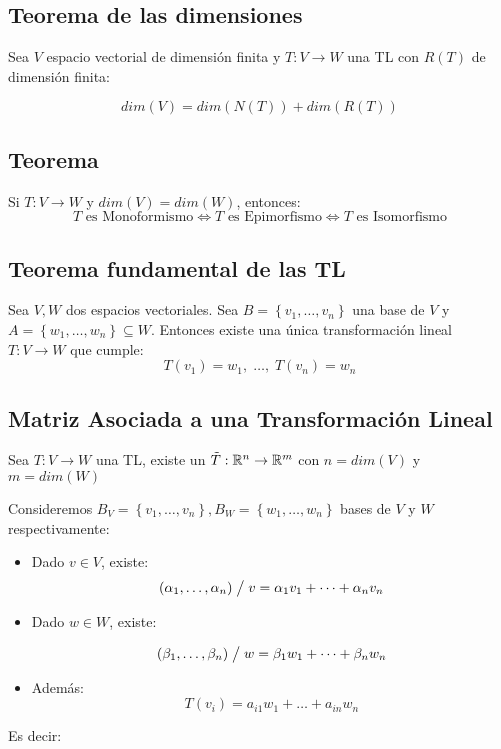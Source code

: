 \subsection{Teorema de las dimensiones}
Sea $ V $ espacio vectorial de dimensión finita y $ T : V \to W $ una TL con $ R(T) $ de dimensión finita:

\[
    dim(V) = dim(N(T)) + dim(R(T))
\]

\subsection{Teorema}
Si $ T: V \to W $ y $ dim(V) = dim(W) $, entonces:
\[
    T \text{ es Monoformismo} \iff T \text{ es Epimorfismo} \iff T \text{ es Isomorfismo}
\]

\subsection{Teorema fundamental de las TL}
Sea $ V,W $ dos espacios vectoriales. Sea $ B =\left\{ v_1, \dots, v_n \right\} $ una base de $ V $ y $ A = \left\{ w_1, \dots, w_n \right\} \subseteq W$. Entonces existe una única transformación lineal $ T:V \to W $ que cumple:
\[
    T(v_1) = w_1, \; \dots, \; T(v_n) = w_n
\]
\subsection{Matriz Asociada a una Transformación Lineal}
Sea $ T :V \to W $ una TL, existe un $ \tilde{T}: \mathbb{R}^n \to \mathbb{R}^m $ con $ n = dim(V) $ y $ m = dim(W) $

Consideremos $ B_V = \left\{ v_1,\dots,v_n \right\}, $$ B_W = \left\{ w_1, \dots, w_n \right\}$ bases de $ V $ y $ W $ respectivamente:

\begin{itemize}
    \item Dado $ v \in V $, existe:
        \[
            (\alpha_1, \dots, \alpha_n) \; \big/ \; v = \alpha_1 v_1 + \dots + \alpha_n v_n
    \]
\item Dado $ w \in W $, existe:

        \[ 
            (\beta_1, \dots, \beta_n) \; \big/ \; w = \beta_1 w_1 + \dots + \beta_n w_n
    \]

\item Además:
    \[
        T(v_i) = a_{i1}w_1 + \dots + a_{in}w_n
    \]
 
\end{itemize}

Es decir:

